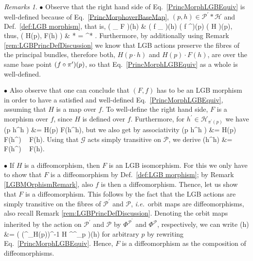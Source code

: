 \documentclass[a4paper,oneside,11pt,bibliography=totoc]{scrartcl}
\def\bas#1\eas{\begin{align*}#1\end{align*}}
\theoremstyle{plain}
\theoremstyle{remark}
\newtheorem{remark}[theorem]{Remarks}
\theoremstyle{definition}
\begin{document}
\begin{remark}
\leavevmode\newline
\indent $\bullet$ Observe that the right hand side of Eq.\ \eqref{PrincMorphLGBEquiv} is well-defined because of Eq.\ \eqref{PrincMorphoverBaseMap}, $(p, h) \in \mathcal{P}^\prime * \mathcal{H}$ and Def.\ \ref{def:LGB morphism}, that is,
\bas
\mleft( \pi_{} \circ F \mright)(h)
&\stackrel{\text{\ref{def:LGB morphism}}}{=}
\mleft( f \circ \pi_{} \mright)(h)
\mleft( f \circ \pi^\prime \mright)(p)
\stackrel{\eqref{PrincMorphoverBaseMap}}{=}
\mleft( \pi \circ H \mright)(p),
\eas
thus,
\bas
\bigl( H(p), F(h) \bigr)
&\in
{} * 
=
\pi^* .
\eas
Furthermore, by additionally using Remark \ref{rem:LGBPrincDefDiscussion} we know that LGB actions preserve the fibres of the principal bundles, therefore both, $H(p \cdot h)$ and $H(p) \cdot F(h)$, are over the same base point $\mleft(f \circ \pi^\prime\mright)(p)$, so that Eq.\ \eqref{PrincMorphLGBEquiv} as a whole is well-defined.

$\bullet$ Also observe that one can conclude that $(F,f)$ has to be an LGB morphism in order to have a satisfied and well-defined Eq.\ \eqref{PrincMorphLGBEquiv}, assuming that $H$ is a map over $f$. To well-define the right hand side, $F$ is a morphism over $f$, since $H$ is defined over $f$. Furthermore, for $h^\prime \in \mathcal{H}_{\pi^\prime(p)}$ we have
\bas
H\mleft(p \cdot h^\prime h \mright)
&=
H(p) \cdot F\mleft(h^\prime h\mright),
\eas
but we also get by associativity
\bas
H\mleft(p \cdot h^\prime h \mright)
&=
H(p) \cdot F\mleft(h^\prime\mright) ~ F(h).
\eas
Using that $\mathcal{G}$ acts simply transitive on $\mathcal{P}$, we derive
\bas
F\mleft(h^\prime h\mright)
&=
F\mleft(h^\prime\mright) ~ F(h).
\eas

$\bullet$ If $H$ is a diffeomorphism, then $F$ is an LGB isomorphism. For this we only have to show that $F$ is a diffeomorphism by Def.\ \ref{def:LGB morphism}; by Remark \ref{LGBMOrphismRemark}, also $f$ is then a diffeomorphism. Thence, let us show that $F$ is a diffeomorphism. This follows by the fact that the LGB actions are simply transitive on the fibres of $\mathcal{P}^\prime$ and $\mathcal{P}$, \textit{i.e.}\ orbit maps are diffeomorphisms, also recall Remark \ref{rem:LGBPrincDefDiscussion}. Denoting the orbit maps inherited by the action on $\mathcal{P}^\prime$ and $\mathcal{P}$ by $\Phi^{\mathcal{P}^\prime}$ and $\Phi^{\mathcal{P}}$, respectively, we can write
\bas
F(h)
&=
\mleft(
	\mleft(\Phi^{}_{H(p)}\mright)^{-1} \circ H \circ \Phi^{^\prime}_p 
\mright)(h)
\eas
for arbitrary $p$ by rewriting Eq.\ \eqref{PrincMorphLGBEquiv}. Hence, $F$ is a diffeomorphism as the composition of diffeomorphisms.


\end{remark}
\end{document}
